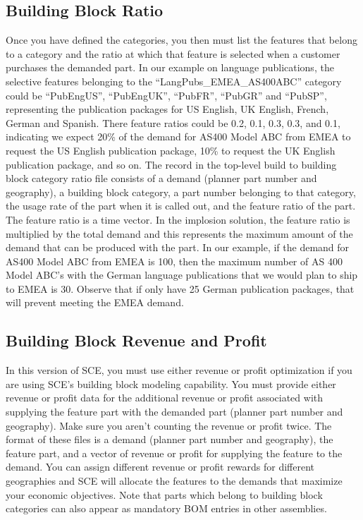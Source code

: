 \subsection{Building Block Ratio}
Once you have defined the categories, you then must list the features
that belong to a category and the ratio at which that feature is
selected when a customer purchases the demanded part.  In our example
on language publications, the selective features belonging to the
``LangPubs\_EMEA\_AS400ABC'' category could be ``PubEngUS'',
``PubEngUK'', ``PubFR'', ``PubGR'' and ``PubSP'', representing the
publication packages for US English, UK English, French, German and
Spanish.  There feature ratios could be 0.2, 0.1, 0.3, 0.3, and 0.1,
indicating we expect 20\% of the demand for AS400 Model ABC from EMEA
to request the US English publication package, 10\% to request the UK
English publication package, and so on.  The record in the top-level
build to building block category ratio file consists of a demand
(planner part number and geography), a building block category, a part
number belonging to that category, the usage rate of the part when it
is called out, and the feature ratio of the part.  The feature ratio
is a time vector.  In the implosion solution, the feature ratio is
multiplied by the total demand and this represents the maximum amount
of the demand that can be produced with the part.  In our example, if
the demand for AS400 Model ABC from EMEA is 100, then the maximum
number of AS 400 Model ABC's with the German language publications
that we would plan to ship to EMEA is 30.  Observe that if only have
25 German publication packages, that will prevent meeting the EMEA
demand.

\subsection{Building Block Revenue and Profit}
In this version of SCE, you must use either revenue or profit
optimization if you are using SCE's building block modeling
capability.  You must provide either revenue or profit data for the
additional revenue or profit associated with supplying the feature
part with the demanded part (planner part number and geography).  Make
sure you aren't counting the revenue or profit twice.  The format of
these files is a demand (planner part number and geography), the
feature part, and a vector of revenue or profit for supplying the
feature to the demand.  You can assign different revenue or profit
rewards for different geographies and SCE will allocate the features
to the demands that maximize your economic objectives.  Note that
parts which belong to building block categories can also appear as
mandatory BOM entries in other assemblies.

